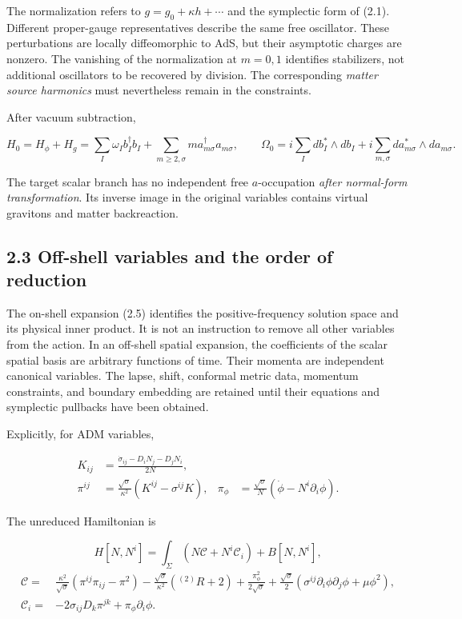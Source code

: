 \documentclass[a4paper,11pt]{article}
\numberwithin{equation}{section}
\begin{document}
The normalization refers to \(g=g_0+\kappa h+\cdots\) and the symplectic form of (2.1). Different proper-gauge representatives describe the same free oscillator. These perturbations are locally diffeomorphic to AdS, but their asymptotic charges are nonzero. The vanishing of the normalization at \(m=0,1\) identifies stabilizers, not additional oscillators to be recovered by division. The corresponding \emph{matter source harmonics} must nevertheless remain in the constraints.

After vacuum subtraction,

\[
H_0=H_\phi+H_g
=\sum_I\omega_I b_I^\dagger b_I
+\sum_{m\ge2,\sigma}m a_{m\sigma}^\dagger a_{m\sigma},
\qquad
\Omega_0=i\sum_I db_I^*\wedge db_I
+i\sum_{m,\sigma}da_{m\sigma}^*\wedge da_{m\sigma}.
\tag{2.9}
\]

The target scalar branch has no independent free \(a\)-occupation \emph{after normal-form transformation}. Its inverse image in the original variables contains virtual gravitons and matter backreaction.

\hypertarget{off-shell-variables-and-the-order-of-reduction}{%
\subsection{2.3 Off-shell variables and the order of reduction}\label{off-shell-variables-and-the-order-of-reduction}}

The on-shell expansion (2.5) identifies the positive-frequency solution space and its physical inner product. It is not an instruction to remove all other variables from the action. In an off-shell spatial expansion, the coefficients of the scalar spatial basis are arbitrary functions of time. Their momenta are independent canonical variables. The lapse, shift, conformal metric data, momentum constraints, and boundary embedding are retained until their equations and symplectic pullbacks have been obtained.

Explicitly, for ADM variables,

\[
\begin{aligned}
K_{ij}&=\frac{\dot\sigma_{ij}-D_iN_j-D_jN_i}{2N},\\
\pi^{ij}&=\frac{\sqrt\sigma}{\kappa^2}(K^{ij}-\sigma^{ij}K),
&
\pi_\phi&=\frac{\sqrt\sigma}{N}(\dot\phi-N^i\partial_i\phi).
\end{aligned}
\tag{2.10}
\]

The unreduced Hamiltonian is

\[
H[N,N^i]=\int_\Sigma(N\mathcal C+N^i\mathcal C_i)+B[N,N^i],
\tag{2.11}
\] \[
\begin{aligned}
\mathcal C={}&
\frac{\kappa^2}{\sqrt\sigma}
(\pi^{ij}\pi_{ij}-\pi^2)
-\frac{\sqrt\sigma}{\kappa^2}({}^{(2)}R+2)
+\frac{\pi_\phi^2}{2\sqrt\sigma}
+\frac{\sqrt\sigma}{2}
(\sigma^{ij}\partial_i\phi\partial_j\phi+\mu\phi^2),\\
\mathcal C_i={}&-2\sigma_{ij}D_k\pi^{jk}+\pi_\phi\partial_i\phi .
\end{aligned}
\tag{2.12}
\]
\end{document}
